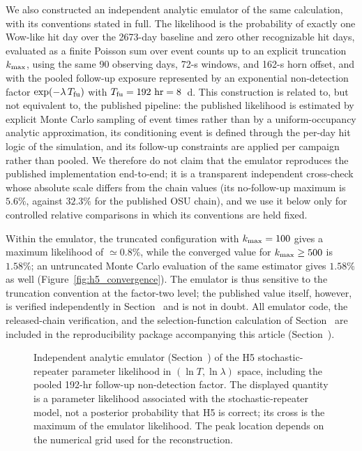 \documentclass[twocolumn]{aastex701}
\newcommand{\kmax}{k_{\rm max}}
\begin{document}
We also constructed an independent analytic emulator of the same calculation, with its conventions stated in full. The likelihood is the probability of exactly one Wow-like hit day over the 2673-day baseline and zero other recognizable hit days, evaluated as a finite Poisson sum over event counts up to an explicit truncation $\kmax$, using the same 90 observing days, 72-s windows, and 162-s horn offset, and with the pooled follow-up exposure represented by an exponential non-detection factor $\exp(-\lambda\,T_{\rm fu})$ with $T_{\rm fu}=192~{\rm hr}=8$~d. This construction is related to, but not equivalent to, the published pipeline: the published likelihood is estimated by explicit Monte Carlo sampling of event times rather than by a uniform-occupancy analytic approximation, its conditioning event is defined through the per-day hit logic of the simulation, and its follow-up constraints are applied per campaign rather than pooled. We therefore do not claim that the emulator reproduces the published implementation end-to-end; it is a transparent independent cross-check whose absolute scale differs from the chain values (its no-follow-up maximum is $5.6\%$, against $32.3\%$ for the published OSU chain), and we use it below only for controlled relative comparisons in which its conventions are held fixed.

Within the emulator, the truncated configuration with $\kmax=100$ gives a maximum likelihood of $\simeq0.8\%$, while the converged value for $\kmax\geq500$ is $1.58\%$; an untruncated Monte Carlo evaluation of the same estimator gives $1.58\%$ as well (Figure~\ref{fig:h5_convergence}). The emulator is thus sensitive to the truncation convention at the factor-two level; the published value itself, however, is verified independently in Section~ and is not in doubt. All emulator code, the released-chain verification, and the selection-function calculation of Section~ are included in the reproducibility package accompanying this article (Section~).

\begin{figure}[ht!]
\caption{Independent analytic emulator (Section~) of the H5 stochastic-repeater parameter likelihood in $(\ln T,\ln\lambda)$ space, including the pooled 192-hr follow-up non-detection factor. The displayed quantity is a parameter likelihood associated with the stochastic-repeater model, not a posterior probability that H5 is correct; its cross is the maximum of the emulator likelihood. The peak location depends on the numerical grid used for the reconstruction.}
\label{fig:h5_likelihood}
\end{figure}
\end{document}
